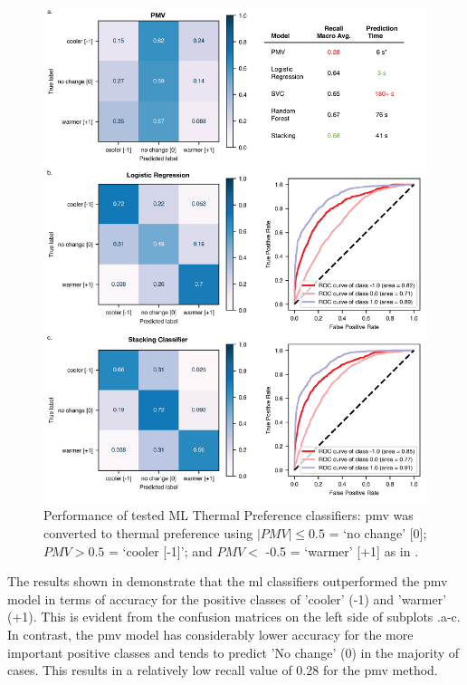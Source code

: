 \begin{figure}[!h]
    \begin{center}
    \includegraphics[width=\textwidth]{manuscript/src/figures/roc-auc.png}
    \caption{Performance of tested ML Thermal Preference classifiers: \gls{pmv} was converted to thermal preference using $|PMV| \le 0.5$ = ‘no change’ [0]; $PMV > 0.5$ = ‘cooler [-1]’; and $PMV <$ -0.5 = ‘warmer’ [+1] as in \citep{KimZhou2018}.}
    \label{fig:jp-iii-roc-auc}
    \end{center}
\end{figure}


The results shown in  demonstrate that the \gls{ml} classifiers outperformed the \gls{pmv} model in terms of accuracy for the positive classes of 'cooler' (-1) and 'warmer' (+1). This is evident from the confusion matrices on the left side of subplots .a-c. In contrast, the \gls{pmv} model has considerably lower accuracy for the more important positive classes and tends to predict 'No change' (0) in the majority of cases. This results in a relatively low recall value of 0.28 for the \gls{pmv} method.

